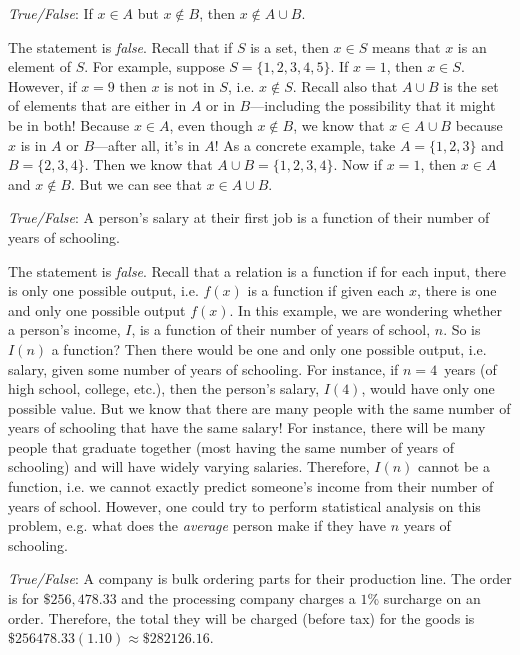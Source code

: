 \documentclass[11pt,letterpaper]{article}
\begin{document}
\thispagestyle{title}


\quizsol \textit{True/False}: If $x \in A$ but $x \notin B$, then $x \notin A \cup B$. \pspace

\sol The statement is \textit{false}. Recall that if $S$ is a set, then $x \in S$ means that $x$ is an element of $S$. For example, suppose $S= \{ 1, 2, 3, 4, 5\}$. If $x= 1$, then $x \in S$. However, if $x= 9$ then $x$ is not in $S$, i.e. $x \notin S$. Recall also that $A \cup B$ is the set of elements that are either in $A$ or in $B$---including the possibility that it might be in both! Because $x \in A$, even though $x \notin B$, we know that $x \in A \cup B$ because $x$ is in $A$ or $B$---after all, it's in $A$! As a concrete example, take $A= \{ 1, 2, 3 \}$ and $B= \{ 2, 3, 4 \}$. Then we know that $A \cup B= \{ 1, 2, 3, 4 \}$. Now if $x= 1$, then $x \in A$ and $x \notin B$. But we can see that $x \in A \cup B$. \pvspace{1.5cm}



\quizsol \textit{True/False}: A person's salary at their first job is a function of their number of years of schooling. \pspace

\sol The statement is \textit{false}. Recall that a relation is a function if for each input, there is only one possible output, i.e. $f(x)$ is a function if given each $x$, there is one and only one possible output $f(x)$. In this example, we are wondering whether a person's income, $I$, is a function of their number of years of school, $n$. So is $I(n)$ a function? Then there would be one and only one possible output, i.e. salary, given some number of years of schooling. For instance, if $n= 4$~years (of high school, college, etc.), then the person's salary, $I(4)$, would have only one possible value. But we know that there are many people with the same number of years of schooling that have the same salary! For instance, there will be many people that graduate together (most having the same number of years of schooling) and will have widely varying salaries. Therefore, $I(n)$ cannot be a function, i.e. we cannot exactly predict someone's income from their number of years of school. However, one could try to perform statistical analysis on this problem, e.g. what does the \textit{average} person make if they have $n$ years of schooling. \pvspace{1.5cm}



\quizsol \textit{True/False}: A company is bulk ordering parts for their production line. The order is for $\$256,478.33$ and the processing company charges a $1$\% surcharge on an order. Therefore, the total they will be charged (before tax) for the goods is $\$256478.33(1.10) \approx \$282126.16$. \pspace
\end{document}
